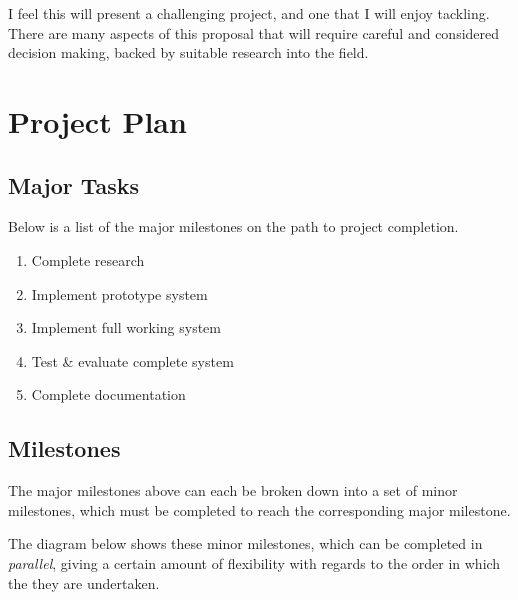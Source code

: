 \documentclass[a4paper]{article}
\begin{document}
    I feel this will present a challenging project, and one that I will enjoy
    tackling. There are many aspects of this proposal that will require careful
    and considered decision making, backed by suitable research into the field.

    \section{Project Plan}

    \subsection{Major Tasks}

    Below is a list of the major milestones on the path to project completion.

    \begin{enumerate}
        \item Complete research
        \item Implement prototype system
        \item Implement full working system
        \item Test \& evaluate complete system
        \item Complete documentation
    \end{enumerate}

    \subsection{Milestones}

    The major milestones above can each be broken down into a set of minor
    milestones, which must be completed to reach the corresponding major
    milestone.

    The diagram below shows these minor milestones, which can be completed in
    \emph{parallel}, giving a certain amount of flexibility with regards to the
    order in which the they are undertaken.
\end{document}

